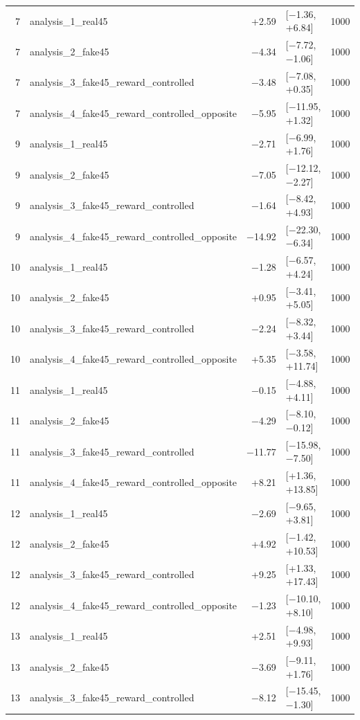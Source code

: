 \begin{table}[htbp]
\begin{tabular}{rlrlr}
    7 & analysis\_1\_real45 & +2.59 & [−1.36, +6.84] & 1000 \\
    7 & analysis\_2\_fake45 & −4.34 & [−7.72, −1.06] & 1000 \\
    7 & analysis\_3\_fake45\_reward\_controlled & −3.48 & [−7.08, +0.35] & 1000 \\
    7 & analysis\_4\_fake45\_reward\_controlled\_opposite & −5.95 & [−11.95, +1.32] & 1000 \\
    9 & analysis\_1\_real45 & −2.71 & [−6.99, +1.76] & 1000 \\
    9 & analysis\_2\_fake45 & −7.05 & [−12.12, −2.27] & 1000 \\
    9 & analysis\_3\_fake45\_reward\_controlled & −1.64 & [−8.42, +4.93] & 1000 \\
    9 & analysis\_4\_fake45\_reward\_controlled\_opposite & −14.92 & [−22.30, −6.34] & 1000 \\
    10 & analysis\_1\_real45 & −1.28 & [−6.57, +4.24] & 1000 \\
    10 & analysis\_2\_fake45 & +0.95 & [−3.41, +5.05] & 1000 \\
    10 & analysis\_3\_fake45\_reward\_controlled & −2.24 & [−8.32, +3.44] & 1000 \\
    10 & analysis\_4\_fake45\_reward\_controlled\_opposite & +5.35 & [−3.58, +11.74] & 1000 \\
    11 & analysis\_1\_real45 & −0.15 & [−4.88, +4.11] & 1000 \\
    11 & analysis\_2\_fake45 & −4.29 & [−8.10, −0.12] & 1000 \\
    11 & analysis\_3\_fake45\_reward\_controlled & −11.77 & [−15.98, −7.50] & 1000 \\
    11 & analysis\_4\_fake45\_reward\_controlled\_opposite & +8.21 & [+1.36, +13.85] & 1000 \\
    12 & analysis\_1\_real45 & −2.69 & [−9.65, +3.81] & 1000 \\
    12 & analysis\_2\_fake45 & +4.92 & [−1.42, +10.53] & 1000 \\
    12 & analysis\_3\_fake45\_reward\_controlled & +9.25 & [+1.33, +17.43] & 1000 \\
    12 & analysis\_4\_fake45\_reward\_controlled\_opposite & −1.23 & [−10.10, +8.10] & 1000 \\
    13 & analysis\_1\_real45 & +2.51 & [−4.98, +9.93] & 1000 \\
    13 & analysis\_2\_fake45 & −3.69 & [−9.11, +1.76] & 1000 \\
    13 & analysis\_3\_fake45\_reward\_controlled & −8.12 & [−15.45, −1.30] & 1000 \\

\end{tabular}
\end{table}
